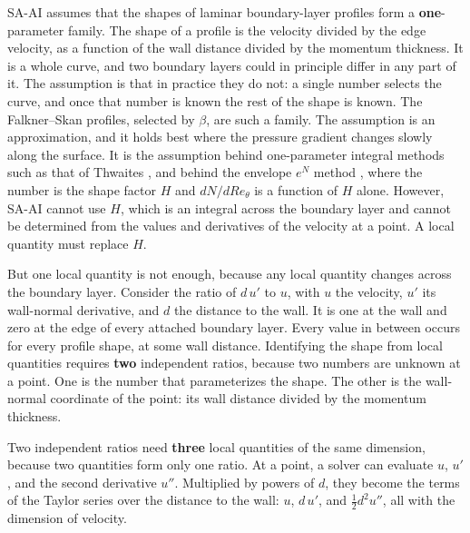 \documentclass[conf]{new-aiaa}
\begin{document}
SA-AI assumes that the shapes of laminar boundary-layer profiles form a
\textbf{one}-parameter family. The shape of a profile is the velocity divided
by the edge velocity, as a function of the wall distance divided by the
momentum thickness. It is a whole curve, and two boundary layers could in
principle differ in any part of it. The assumption is that in practice they
do not: a single number selects the curve, and once that number is known the
rest of the shape is known. The Falkner--Skan profiles, selected by $\beta$,
are such a family. The assumption is an approximation, and it holds best where
the pressure gradient changes slowly along the surface. It is the assumption
behind one-parameter integral methods such as that of Thwaites
\cite{thwaites_1949}, and behind the envelope $e^N$ method
\cite{drela_giles_1987}, where the number is the shape factor $H$ and
$dN/dRe_\theta$ is a function of $H$ alone. However, SA-AI cannot use $H$,
which is an integral across the boundary layer and cannot be determined from the values and
derivatives of the velocity at a point. A local quantity must replace $H$.

But one local quantity is not enough, because any local quantity changes across the boundary layer. Consider the ratio of $d\,u'$ to $u$, with $u$ the velocity, $u'$ its
wall-normal derivative, and $d$ the distance to the wall. It is one at the
wall and zero at the edge of every attached boundary layer. Every value in between occurs for every profile shape, at some wall distance. Identifying the shape from local quantities requires \textbf{two} independent ratios, because two numbers are unknown at a point. One is the
number that parameterizes the shape. The other is the wall-normal coordinate of the point: its wall distance
divided by the momentum thickness.

Two independent ratios need \textbf{three} local quantities of the same dimension, because two quantities form only one ratio. At a point, a solver
can evaluate $u$, $u'$, and the second derivative $u''$. Multiplied by powers
of $d$, they become the terms of the Taylor series over the distance to the
wall: $u$, $d\,u'$, and $\tfrac12 d^2u''$, all with the dimension of velocity.
\end{document}
